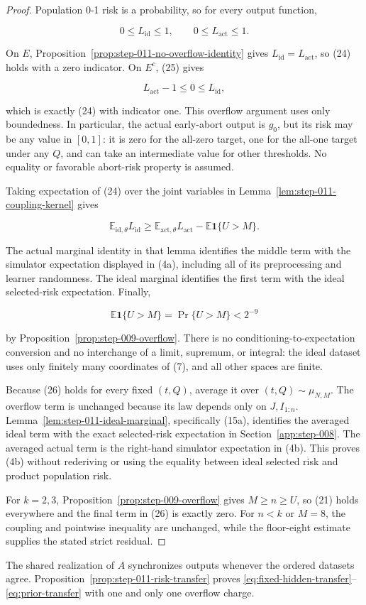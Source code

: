 \begin{proof}
Population 0-1 risk is a probability, so for every output function,

\[
  0\le L_{\mathrm{id}}\le1,
  \qquad
  0\le L_{\mathrm{act}}\le1.
\tag{25}
\]

On \(E\), Proposition~\ref{prop:step-011-no-overflow-identity} gives
\(L_{\mathrm{id}}=L_{\mathrm{act}}\), so (24) holds with a zero
indicator. On \(E^c\), (25) gives

\[
  L_{\mathrm{act}}-1\le0\le L_{\mathrm{id}},
\]

which is exactly (24) with indicator one. This overflow argument uses only
boundedness. In particular, the actual early-abort output is \(g_0\), but
its risk may be any value in \([0,1]\): it is zero for the all-zero target,
one for the all-one target under any \(Q\), and can take an intermediate
value for other thresholds. No equality or favorable abort-risk property
is assumed.

Taking expectation of (24) over the joint variables in
Lemma~\ref{lem:step-011-coupling-kernel} gives

\[
  \mathbb E_{\mathrm{id},\theta}L_{\mathrm{id}}
  \ge
  \mathbb E_{\mathrm{act},\theta}L_{\mathrm{act}}
  -\mathbb E\mathbf1\{U>M\}.
\tag{26}
\]

The actual marginal identity in that lemma identifies the middle term with
the simulator expectation displayed in (4a), including all of its
preprocessing and learner randomness. The ideal marginal identifies the
first term with the ideal selected-risk expectation. Finally,

\[
  \mathbb E\mathbf1\{U>M\}=\Pr\{U>M\}<2^{-9}
\tag{27}
\]

by Proposition~\ref{prop:step-009-overflow}. There is no conditioning-to-expectation
conversion and no interchange of a limit, supremum, or integral: the
ideal dataset uses only finitely many coordinates of (7), and all other
spaces are finite.

Because (26) holds for every fixed \((t,Q)\), average it over
\((t,Q)\sim\mu_{N,M}\). The overflow term is unchanged because its law
depends only on \(J,I_{1:n}\). Lemma~\ref{lem:step-011-ideal-marginal},
specifically (15a), identifies the averaged ideal term with the exact
selected-risk expectation in Section~\ref{app:step-008}. The averaged
actual term is
the right-hand simulator expectation in (4b). This proves (4b) without
rederiving or using the equality between ideal selected risk and
product population risk.

For \(k=2,3\), Proposition~\ref{prop:step-009-overflow} gives
\(M\ge n\ge U\), so (21) holds everywhere and the final term in (26) is
exactly zero. For \(n<k\) or \(M=8\), the coupling and pointwise inequality
are unchanged, while the floor-eight estimate supplies the stated
strict residual. \end{proof}
The shared realization of $A$ synchronizes outputs whenever the ordered
datasets agree.  Proposition~\ref{prop:step-011-risk-transfer} proves
\eqref{eq:fixed-hidden-transfer}--\eqref{eq:prior-transfer} with one and
only one overflow charge.

